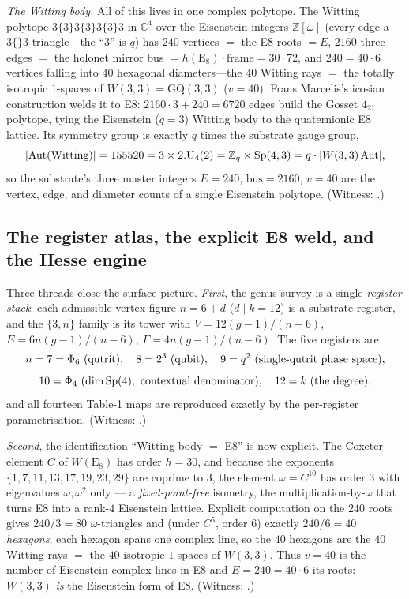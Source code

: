 \documentclass[11pt]{article}
\begin{document}
\emph{The Witting body.} All of this lives in one complex polytope. The Witting
polytope $3\{3\}3\{3\}3\{3\}3$ in $\mathbb C^4$ over the Eisenstein integers
$\mathbb Z[\omega]$ (every edge a $3\{\}3$ triangle---the ``$3$'' is $q$) has
$240$ vertices $=$ the E8 roots $=E$, $2160$ three-edges $=$ the holonet mirror
bus $=h(\mathrm E_8)\cdot\mathrm{frame}=30\cdot72$, and $240=40\cdot6$ vertices
falling into $40$ hexagonal diameters---the $40$ Witting rays $=$ the totally
isotropic $1$-spaces of $W(3,3)=\mathrm{GQ}(3,3)$ ($v=40$). Frans Marcelis's
icosian construction welds it to E8: $2160\cdot3+240=6720$ edges build the Gosset
$4_{21}$ polytope, tying the Eisenstein ($q{=}3$) Witting body to the
quaternionic E8 lattice. Its symmetry group is exactly $q$ times the substrate
gauge group,
\[
  |\mathrm{Aut}(\hbox{Witting})| = 155520 = 3\times 2.\mathrm U_4(2)
    = \mathbb Z_q\times \mathrm{Sp}(4,3) = q\cdot|W(3,3)\,\mathrm{Aut}|,
\]
so the substrate's three master integers $E=240$, $\mathrm{bus}=2160$, $v=40$ are
the vertex, edge, and diameter counts of a single Eisenstein polytope. (Witness:
.)

\subsection{The register atlas, the explicit E8 weld, and the Hesse engine}

Three threads close the surface picture. \emph{First}, the genus survey is a
single \emph{register stack}: each admissible vertex figure $n=6+d$ ($d\mid k=12$)
is a substrate register, and the $\{3,n\}$ family is its tower with
$V=12(g-1)/(n-6)$, $E=6n(g-1)/(n-6)$, $F=4n(g-1)/(n-6)$. The five registers are
\[
  n=7=\Phi_6\ (\hbox{qutrit}),\quad 8=2^3\ (\hbox{qubit}),\quad
  9=q^2\ (\hbox{single-qutrit phase space}),
\]
\[
  10=\Phi_4\ (\dim\mathrm{Sp}(4),\ \hbox{contextual denominator}),\quad
  12=k\ (\hbox{the degree}),
\]
and all fourteen Table-1 maps are reproduced exactly by the per-register
parametrisation. (Witness: .)

\emph{Second}, the identification ``Witting body $=$ E8'' is now explicit. The
Coxeter element $C$ of $W(\mathrm E_8)$ has order $h=30$, and because the
exponents $\{1,7,11,13,17,19,23,29\}$ are coprime to $3$, the element
$\omega=C^{10}$ has order $3$ with eigenvalues $\omega,\omega^2$ only --- a
\emph{fixed-point-free} isometry, the multiplication-by-$\omega$ that turns E8
into a rank-$4$ Eisenstein lattice. Explicit computation on the $240$ roots gives
$240/3=80$ $\omega$-triangles and (under $C^5$, order $6$) exactly
$240/6=40$ \emph{hexagons}; each hexagon spans one complex line, so the $40$
hexagons are the $40$ Witting rays $=$ the $40$ isotropic $1$-spaces of $W(3,3)$.
Thus $v=40$ is the number of Eisenstein complex lines in E8 and $E=240=40\cdot6$
its roots: $W(3,3)$ \emph{is} the Eisenstein form of E8. (Witness:
.)
\end{document}
